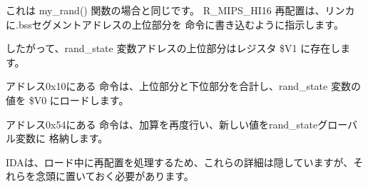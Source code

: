 これは my\_rand() 関数の場合と同じです。 R\_MIPS\_HI16 再配置は、リンカに.bssセグメントアドレスの上位部分を 
\LUI 命令に書き込むように指示します。

したがって、rand\_state 変数アドレスの上位部分はレジスタ \$V1 に存在します。

アドレス0x10にある \LW 命令は、上位部分と下位部分を合計し、rand\_state
変数の値を \$V0 にロードします。

アドレス0x54にある \SW 命令は、加算を再度行い、新しい値をrand\_stateグローバル変数に
格納します。

IDAは、ロード中に再配置を処理するため、これらの詳細は隠していますが、それらを念頭に置いておく必要があります。

